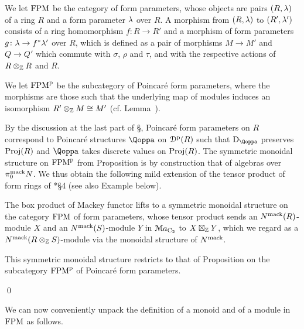 \begin{definition}
We let $\mathrm {FPM}$ be the category of form parameters, whose objects are pairs $(R,\lambda)$ of a ring $R$ and a form parameter $\lambda$ over $R$. A morphism from  $(R,\lambda)$ to  $(R',\lambda')$ consists of a ring homomorphism $f\colon R\to R'$ and a morphism of form parameters $g\colon \lambda\to f^\ast \lambda'$ over $R$, which is defined as a pair of morphisms $M\to M'$ and $Q\to Q'$ which commute with $\sigma$, $\rho$ and $\tau$, and with the respective actions of $R\otimes_{\mathbb{Z}} R$ and $R$. 

We let $\mathrm {FPM}^{\mathrm p}$ be the subcategory of Poincar\'e form parameters, where the morphisms are those such that the underlying map of modules induces an isomorphism  $R'\otimes_{\mathbb{Z}} M\cong M'$ (cf. Lemma~).
\end{definition}




By the discussion at the last part of \S{}, Poincaré form parameters on $R$ correspond to Poincaré structures $\QF$ on ${\mathcal D}^{\mathrm{p}}(R)$ such that $\Dual_{\QF}$ preserves $\mathrm{Proj}(R)$ and $\QF$ takes discrete values on $\mathrm{Proj}(R)$. 
The symmetric monoidal structure on $\mathrm {FPM}^{\mathrm p}$ from Proposition  is by construction that of algebras over $\pi^{\mathrm{mack}}_0N$. We thus obtain the following mild extension of the tensor product of form rings of  \cite{SchlichtinghigherI}*{\S 4} (see also Example  below).


\begin{proposition}
\label{prop:tensormackeyvstensorfpm}%
 The box product of Mackey functor lifts to a symmetric monoidal structure on the category $\mathrm {FPM}$ of form parameters, whose tensor product sends an $N^{\mathrm{mack}}(R)$-module $X$ and an $N^{\mathrm{mack}}(S)$-module $Y$ in $\mathcal{M}a_{\mathrm{C_2}}$ to $X\boxtimes_{\mathbb{Z}} Y$, which we regard as a $N^{\mathrm{mack}}(R\otimes_{\mathbb{Z}} S)$-module via the monoidal structure of $N^{\mathrm{mack}}$.

This symmetric monoidal structure restricts to that of Proposition  on the subcategory $\mathrm {FPM}^{\mathrm p}$ of Poincar\'e form parameters.

\qed
\end{proposition}

We can now conveniently unpack the definition of a monoid and of a module in  $\mathrm {FPM}$ as follows.

